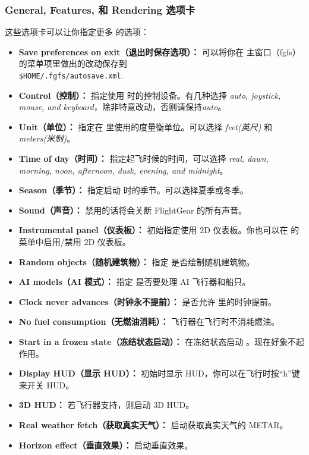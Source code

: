 \subsubsection{General, Features, 和 Rendering 选项卡}
这些选项卡可以让你指定更多 \FlightGear{} 的选项：
\begin{itemize}
\item \textbf{Save preferences on exit（退出时保存选项）：} 可以将你在 \FlightGear{} 主窗口（fgfs）的菜单项里做出的改动保存到 \\ \texttt{\$HOME/.fgfs/autosave.xml}.
\item \textbf{Control（控制）：} 指定使用 \FlightGear{} 时的控制设备。有几种选择 \textit{auto, joystick, mouse, and keyboard}，除非特意改动，否则请保持\textit{auto}。
\item \textbf{Unit（单位）：} 指定在 \FlightGear{} 里使用的度量衡单位。可以选择 \textit{feet(英尺)} 和 \textit{meters(米制)}。
\item \textbf{Time of day（时间）：} 指定起飞时候的时间，可以选择 \textit{real, dawn, morning, noon, afternoon, dusk, evening, and midnight}。
\item \textbf{Season（季节）：} 指定启动 \FlightGear{} 时的季节。可以选择夏季或冬季。
\item \textbf{Sound（声音）：} 禁用的话将会关断 FlightGear 的所有声音。
\item \textbf{Instrumental panel（仪表板）：} 初始指定使用 2D 仪表板。你也可以在 \FlightGear{} 的菜单中启用/禁用 2D 仪表板。
\item \textbf{Random objects（随机建筑物）：} 指定 \FlightGear{} 是否绘制随机建筑物。
\item \textbf{AI models（AI 模式）：} 指定 \FlightGear{} 是否要处理 AI 飞行器和船只。
\item \textbf{Clock never advances（时钟永不提前）：} 是否允许 \FlightGear{} 里的时钟提前。
\item \textbf{No fuel consumption（无燃油消耗）：} 飞行器在飞行时不消耗燃油。
\item \textbf{Start in a frozen state（冻结状态启动）：} 在冻结状态启动 \FlightGear{}。现在好象不起作用。
\item \textbf{Display HUD（显示 HUD）：} 初始时显示 HUD，你可以在飞行时按“h”键来开关 HUD。
\item \textbf{3D HUD：} 若飞行器支持，则启动 3D HUD。
\item \textbf{Real weather fetch（获取真实天气）：} 启动获取真实天气的 METAR。
\item \textbf{Horizon effect（垂直效果）：} 启动垂直效果。

\end{itemize}
